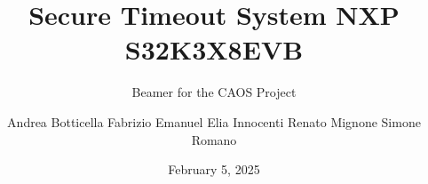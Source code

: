 \documentclass{beamer}
\title{Secure Timeout System \newline NXP S32K3X8EVB}
\subtitle{Beamer for the CAOS Project}
\author{
    \newline Andrea Botticella
    \newline Fabrizio Emanuel 
    \newline Elia Innocenti
    \newline Renato Mignone 
    \newline Simone Romano     
}
\date{February 5, 2025}
\begin{document}
\maketitle







\title{} %
\backmatter
\end{document}
